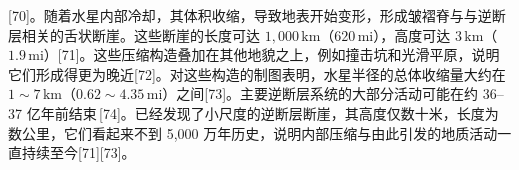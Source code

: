 










































































[70]。随着水星内部冷却，其体积收缩，导致地表开始变形，形成皱褶脊与与逆断层相关的舌状断崖。这些断崖的长度可达 \(1{,}000\,\mathrm{km}\)（\(620\,\mathrm{mi}\)），高度可达 \(3\,\mathrm{km}\)（\(1.9\,\mathrm{mi}\)）[71]。这些压缩构造叠加在其他地貌之上，例如撞击坑和光滑平原，说明它们形成得更为晚近[72]。对这些构造的制图表明，水星半径的总体收缩量大约在 \(1\sim7\,\mathrm{km}\)（\(0.62\sim4.35\,\mathrm{mi}\)）之间[73]。主要逆断层系统的大部分活动可能在约 36–37 亿年前结束\,[74]。已经发现了小尺度的逆断层断崖，其高度仅数十米，长度为数公里，它们看起来不到 5,000 万年历史，说明内部压缩与由此引发的地质活动一直持续至今[71][73]。











